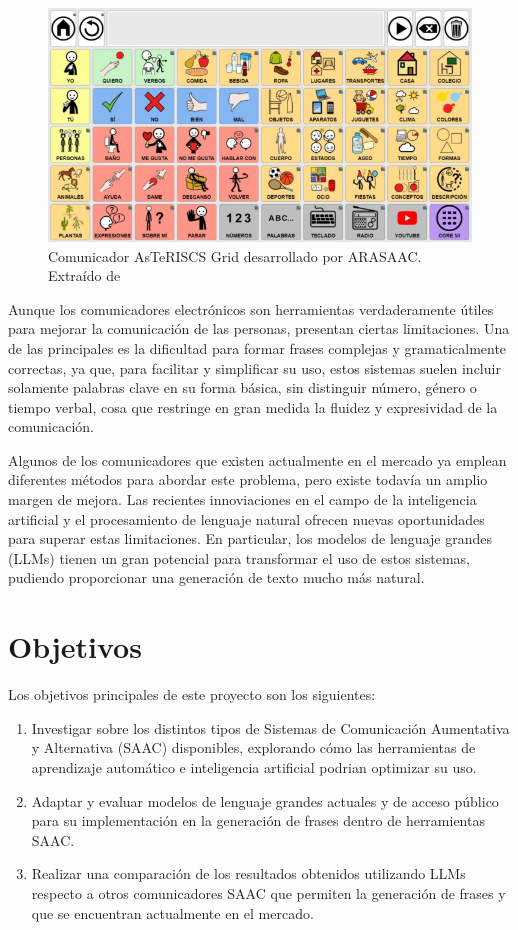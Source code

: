 \documentclass[11pt,spanish,listoffigures,listoftables]{tfgetsinf}
\begin{document}
\begin{figure}[h]
\includegraphics[scale = 0.8]{images/comunicador.jpg}
\centering
\caption{Comunicador AsTeRISCS Grid desarrollado por ARASAAC. Extraído de \cite{asterics_grid_comunicador}}
\label{fig:comunicador}
\end{figure}

Aunque los comunicadores electrónicos son herramientas verdaderamente útiles para mejorar la comunicación de las personas, presentan ciertas limitaciones. Una de las principales es la dificultad para formar frases complejas y gramaticalmente correctas, ya que, para facilitar y simplificar su uso, estos sistemas suelen incluir solamente palabras clave en su forma básica, sin distinguir número, género o tiempo verbal, cosa que restringe en gran medida la fluidez y expresividad de la comunicación.

Algunos de los comunicadores que existen actualmente en el mercado ya emplean diferentes métodos para abordar este problema, pero existe todavía un amplio margen de mejora. Las recientes innoviaciones en el campo de la inteligencia artificial y el procesamiento de lenguaje natural ofrecen nuevas oportunidades para superar estas limitaciones. En particular, los modelos de lenguaje grandes (LLMs) tienen un gran potencial para transformar el uso de estos sistemas, pudiendo proporcionar una generación de texto mucho más natural.

\section{Objetivos}

Los objetivos principales de este proyecto son los siguientes:

\begin{enumerate}
	\item Investigar sobre los distintos tipos de Sistemas de Comunicación Aumentativa y Alternativa (SAAC) disponibles, explorando cómo las herramientas de aprendizaje automático e inteligencia artificial podrian optimizar su uso.
	\item Adaptar y evaluar modelos de lenguaje grandes actuales y de acceso público para su implementación  en la generación de frases dentro de herramientas SAAC.
	\item Realizar una comparación de los resultados obtenidos utilizando LLMs respecto a otros comunicadores SAAC que permiten la generación de frases y que se encuentran actualmente en el mercado.
\end{enumerate}
\end{document}
